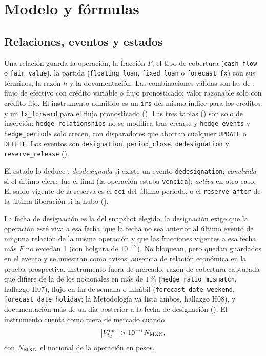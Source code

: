 \section{Modelo y fórmulas}\label{sec:cap10-modelo}

\subsection{Relaciones, eventos y estados}\label{sec:cap10-datos}

Una relación guarda la operación, la fracción $F$, el tipo de cobertura (\texttt{cash\_flow} o \texttt{fair\_value}), la
partida (\texttt{floating\_loan}, \texttt{fixed\_loan} o \texttt{forecast\_fx}) con sus términos, la razón $h$ y la
documentación. Las combinaciones válidas son las de : flujo de efectivo con
crédito variable o flujo pronosticado; valor razonable solo con crédito fijo. El instrumento admitido es un \texttt{irs}
del mismo índice para los créditos y un \texttt{fx\_forward} para el flujo pronosticado
(). Las tres tablas () son solo de
inserción: \texttt{hedge\_relationships} no se modifica tras crearse y \texttt{hedge\_events} y
\texttt{hedge\_periods} solo crecen, con disparadores que abortan cualquier \texttt{UPDATE} o \texttt{DELETE}. Los eventos
son \texttt{designation}, \texttt{period\_close}, \texttt{dedesignation} y \texttt{reserve\_release}
().

El estado lo deduce : \emph{desdesignada} si existe un evento \texttt{dedesignation};
\emph{concluida} si el último cierre fue el final (la operación estaba \texttt{vencida}); \emph{activa} en otro caso. El
saldo vigente de la reserva es el \texttt{oci} del último periodo, o el \texttt{reserve\_after} de la última liberación si
la hubo ().

La fecha de designación es la del snapshot elegido; la designación exige que la operación esté viva a esa fecha, que
la fecha no sea anterior al último evento de ninguna relación de la misma operación y que las fracciones vigentes a esa
fecha más $F$ no excedan 1 (con holgura de $10^{-12}$). No bloquean, pero quedan guardados en el evento y se muestran
como avisos: ausencia de relación económica en la prueba prospectiva, instrumento fuera de mercado, razón de
cobertura capturada que difiere de la de los nocionales en más de $1\,\%$ (\texttt{hedge\_ratio\_mismatch}, hallazgo H07),
flujo en fin de semana o inhábil (\texttt{forecast\_date\_weekend}, \texttt{forecast\_date\_holiday}; la Metodología
ya lista ambos, hallazgo H08), y documentación más de un día posterior a la fecha de designación
(). El instrumento cuenta como fuera de mercado cuando
\begin{equation}\label{eq:cap10-fuera-mercado}
  \bigl|V^{\mathrm{ins}}_{t_d}\bigr| > 10^{-6}\,N_{\textup{MXN}},
\end{equation}
con $N_{\textup{MXN}}$ el nocional de la operación en pesos.

